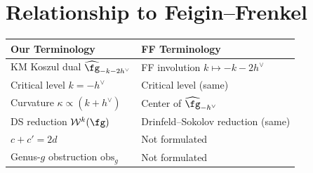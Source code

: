 \section{Relationship to Feigin--Frenkel}

\begin{tabular}{>{\raggedright\arraybackslash}p{}>{\raggedright\arraybackslash}p{}}
\textbf{Our Terminology} & \textbf{FF Terminology} \\
\hline
KM Koszul dual $\widehat{\fg}_{-k-2h^\vee}$ & FF involution $k \mapsto -k - 2h^\vee$ \\
Critical level $k = -h^\vee$ & Critical level (same) \\
Curvature $\kappa \propto (k + h^\vee)$ & Center of $\widehat{\fg}_{-h^\vee}$ \\
DS reduction $\mathcal{W}^k(\fg)$ & Drinfeld--Sokolov reduction (same) \\
$c + c' = 2d$ & Not formulated \\
Genus-$g$ obstruction $\mathrm{obs}_g$ & Not formulated \\
\end{tabular}

